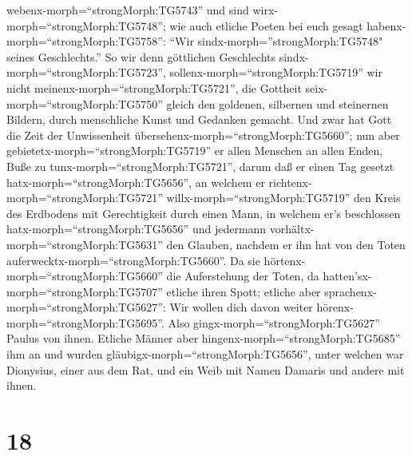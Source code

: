 webenx-morph=``strongMorph:TG5743'' und sind
wirx-morph=``strongMorph:TG5748''; wie auch etliche Poeten bei euch
gesagt habenx-morph=``strongMorph:TG5758'': ``Wir
sindx-morph=''strongMorph:TG5748" seines Geschlechts.''  So
wir denn göttlichen Geschlechts sindx-morph=``strongMorph:TG5723'',
sollenx-morph=``strongMorph:TG5719'' wir nicht
meinenx-morph=``strongMorph:TG5721'', die Gottheit
seix-morph=``strongMorph:TG5750'' gleich den goldenen, silbernen und
steinernen Bildern, durch menschliche Kunst und Gedanken gemacht.
 Und zwar hat Gott die Zeit der Unwissenheit
übersehenx-morph=``strongMorph:TG5660''; nun aber
gebietetx-morph=``strongMorph:TG5719'' er allen Menschen an allen Enden,
Buße zu tunx-morph=``strongMorph:TG5721'',  darum daß er
einen Tag gesetzt hatx-morph=``strongMorph:TG5656'', an welchem er
richtenx-morph=``strongMorph:TG5721'' willx-morph=``strongMorph:TG5719''
den Kreis des Erdbodens mit Gerechtigkeit durch einen Mann, in welchem
er's beschlossen hatx-morph=``strongMorph:TG5656'' und jedermann
vorhältx-morph=``strongMorph:TG5631'' den Glauben, nachdem er ihn hat
von den Toten auferwecktx-morph=``strongMorph:TG5660''.  Da
sie hörtenx-morph=``strongMorph:TG5660'' die Auferstehung der Toten, da
hatten'sx-morph=``strongMorph:TG5707'' etliche ihren Spott; etliche aber
sprachenx-morph=``strongMorph:TG5627'': Wir wollen dich davon weiter
hörenx-morph=``strongMorph:TG5695''.  Also
gingx-morph=``strongMorph:TG5627'' Paulus von ihnen. 
Etliche Männer aber hingenx-morph=``strongMorph:TG5685'' ihm an und
wurden gläubigx-morph=``strongMorph:TG5656'', unter welchen war
Dionysius, einer aus dem Rat, und ein Weib mit Namen Damaris und andere
mit ihnen.

\hypertarget{section-17}{%
\section{18}\label{section-17}}

